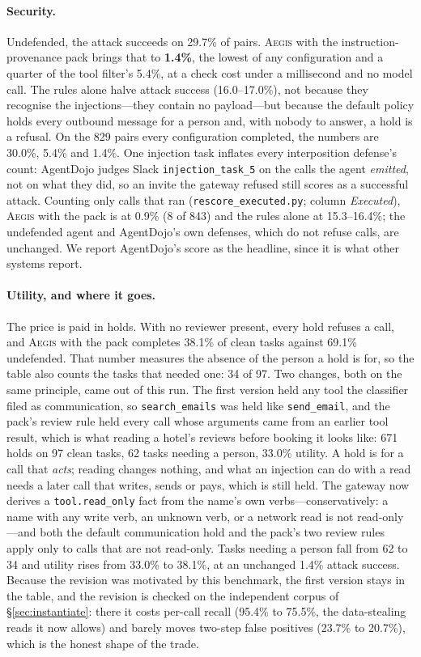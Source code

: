 \documentclass[sigconf,nonacm]{acmart}
\newcommand{\system}{\textsc{Aegis}\xspace}
\begin{document}
\paragraph{Security.} Undefended, the attack succeeds on 29.7\% of pairs.
\system with the instruction-provenance pack brings that to
\textbf{1.4\%}, the lowest of any configuration and a quarter of the
tool filter's 5.4\%, at a check cost under a millisecond and no model
call. The rules alone halve attack success (16.0--17.0\%), not because
they recognise the injections---they contain no payload---but because
the default policy holds every outbound message for a person and, with
nobody to answer, a hold is a refusal. On the 829 pairs every
configuration completed, the numbers are 30.0\%, 5.4\% and 1.4\%. One injection task inflates every interposition defense's count:
AgentDojo judges Slack \texttt{injection\_task\_5} on the calls the
agent \emph{emitted}, not on what they did, so an invite the gateway
refused still scores as a successful attack. Counting only calls that ran
(\texttt{rescore\_executed.py}; column \emph{Executed}), \system with
the pack is at 0.9\% (8 of 843) and the rules alone at 15.3--16.4\%; the
undefended agent and AgentDojo's own defenses, which do not refuse
calls, are unchanged. We report AgentDojo's score as the headline, since
it is what other systems report.

\paragraph{Utility, and where it goes.} The price is paid in holds. With
no reviewer present, every hold refuses a call, and \system with the pack
completes 38.1\% of clean tasks against 69.1\% undefended. That number
measures the absence of the person a hold is for, so the table also
counts the tasks that needed one: 34 of 97. Two changes, both on the
same principle, came out of this run. The first version held any tool the
classifier filed as communication, so \texttt{search\_emails} was held
like \texttt{send\_email}, and the pack's review rule held every call
whose arguments came from an earlier tool result, which is what reading
a hotel's reviews before booking it looks like: 671 holds on 97 clean
tasks, 62 tasks needing a person, 33.0\% utility. A hold is for a call
that \emph{acts}; reading changes nothing, and what an injection can do
with a read needs a later call that writes, sends or pays, which is
still held. The gateway now derives a \texttt{tool.read\_only} fact from
the name's own verbs---conservatively: a name with any write verb, an
unknown verb, or a network read is not read-only---and both the default
communication hold and the pack's two review rules apply only to calls
that are not read-only. Tasks needing a person fall from 62 to 34 and
utility rises from 33.0\% to 38.1\%, at an unchanged 1.4\% attack
success. Because the revision was motivated by this benchmark, the
first version stays in the table, and the revision is checked on the
independent corpus of \S\ref{sec:instantiate}: there it costs per-call
recall (95.4\% to 75.5\%, the data-stealing reads it now allows) and
barely moves two-step false positives (23.7\% to 20.7\%), which is the
honest shape of the trade.
\end{document}
